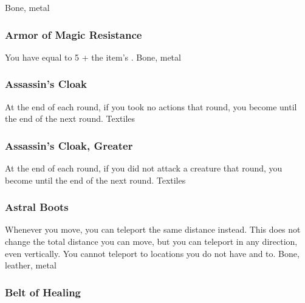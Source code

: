  
 Bone, metal
\lowercase{\hypertarget{item:Armor of Magic Resistance}{}}\label{item:Armor of Magic Resistance}
\hypertarget{item:Armor of Magic Resistance}{\subsubsection{Armor of Magic Resistance\hfill{}}}
You have  equal to 5 + the item's .
 
 Bone, metal
\lowercase{\hypertarget{item:Assassin's Cloak}{}}\label{item:Assassin's Cloak}
\hypertarget{item:Assassin's Cloak}{\subsubsection{Assassin's Cloak\hfill{}}}
At the end of each round, if you took no actions that round, you become  until the end of the next round.
 
 Textiles
\lowercase{\hypertarget{item:Assassin's Cloak, Greater}{}}\label{item:Assassin's Cloak, Greater}
\hypertarget{item:Assassin's Cloak, Greater}{\subsubsection{Assassin's Cloak, Greater\hfill{}}}
At the end of each round, if you did not attack a creature that round, you become  until the end of the next round.
 
 Textiles
\lowercase{\hypertarget{item:Astral Boots}{}}\label{item:Astral Boots}
\hypertarget{item:Astral Boots}{\subsubsection{Astral Boots\hfill{}}}
Whenever you move, you can teleport the same distance instead.
This does not change the total distance you can move, but you can teleport in any direction, even vertically.
You cannot teleport to locations you do not have  and  to.
 
 Bone, leather, metal
\lowercase{\hypertarget{item:Belt of Healing}{}}\label{item:Belt of Healing}
\hypertarget{item:Belt of Healing}{\subsubsection{Belt of Healing\hfill{}}}
